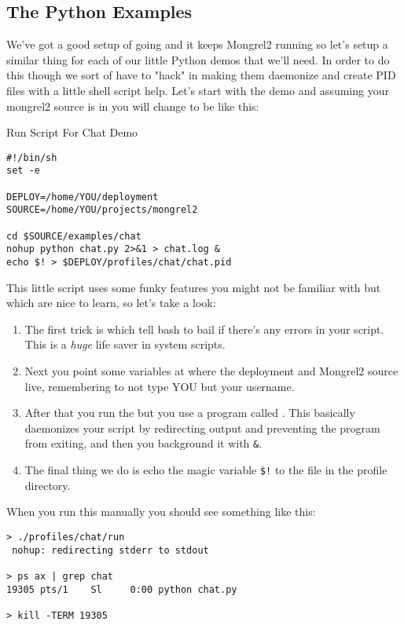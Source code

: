 \subsection{The Python Examples}

We've got a good setup of  going and it keeps Mongrel2 
running so let's setup a similar thing for each of our little
Python demos that we'll need.  In order to do this though we sort
of have to "hack" in making them daemonize and create PID files with
a little shell script help.  Let's start with the  demo
and assuming your mongrel2 source is in  
you will change  to be like this:

\begin{code}{Run Script For Chat Demo}
\begin{Verbatim}
#!/bin/sh
set -e

DEPLOY=/home/YOU/deployment
SOURCE=/home/YOU/projects/mongrel2

cd $SOURCE/examples/chat
nohup python chat.py 2>&1 > chat.log &
echo $! > $DEPLOY/profiles/chat/chat.pid
\end{Verbatim}
\end{code}

This little script uses some funky features you might not be familiar
with but which are nice to learn, so let's take a look:



\begin{enumerate}
\item The first trick is  which tell bash to bail if there's 
    any errors in your script.  This is a \emph{huge} life saver in system
    scripts.
\item Next you point some variables at where the deployment and Mongrel2 source
    live, remembering to not type YOU but your username.
\item After that you run the  but you use a program called .  
    This basically daemonizes your script by redirecting output and 
    preventing the program from exiting, and then you background it with \verb|&|.
\item The final thing we do is echo the magic variable \verb|$!| to the 
     file in the profile directory.
\end{enumerate}

When you run this manually you should see something like this:

\begin{Verbatim}
> ./profiles/chat/run 
 nohup: redirecting stderr to stdout

> ps ax | grep chat
19305 pts/1    Sl     0:00 python chat.py

> kill -TERM 19305
\end{Verbatim}

